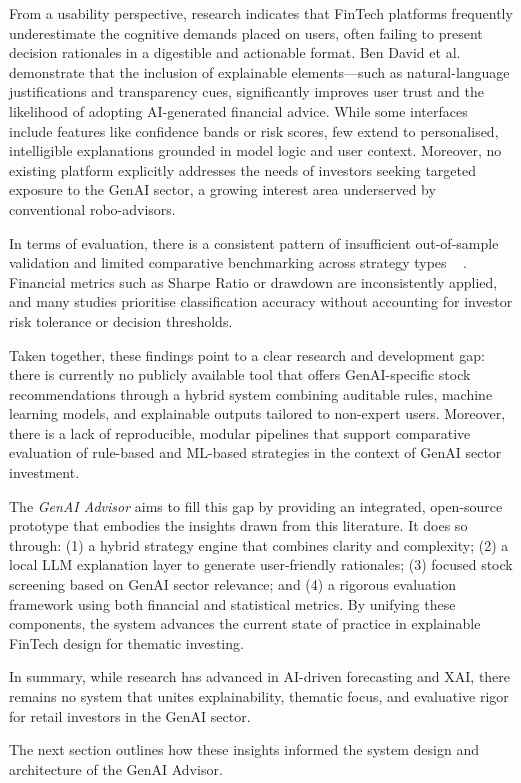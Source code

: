 From a usability perspective, research indicates that FinTech platforms frequently underestimate the cognitive demands placed on users, often failing to present decision rationales in a digestible and actionable format. Ben David et al.~\cite{bendavid2021explainable} demonstrate that the inclusion of explainable elements—such as natural-language justifications and transparency cues, significantly improves user trust and the likelihood of adopting AI-generated financial advice. While some interfaces include features like confidence bands or risk scores, few extend to personalised, intelligible explanations grounded in model logic and user context. Moreover, no existing platform explicitly addresses the needs of investors seeking targeted exposure to the GenAI sector, a growing interest area underserved by conventional robo-advisors.

In terms of evaluation, there is a consistent pattern of insufficient out-of-sample validation and limited comparative benchmarking across strategy types ~\cite{bailey2014backtest} \cite{kaastra1996forecasting}. Financial metrics such as Sharpe Ratio or drawdown are inconsistently applied, and many studies prioritise classification accuracy without accounting for investor risk tolerance or decision thresholds.

Taken together, these findings point to a clear research and development gap: there is currently no publicly available tool that offers GenAI-specific stock recommendations through a hybrid system combining auditable rules, machine learning models, and explainable outputs tailored to non-expert users. Moreover, there is a lack of reproducible, modular pipelines that support comparative evaluation of rule-based and ML-based strategies in the context of GenAI sector investment.

The \textit{GenAI Advisor} aims to fill this gap by providing an integrated, open-source prototype that embodies the insights drawn from this literature. It does so through: (1) a hybrid strategy engine that combines clarity and complexity; (2) a local LLM explanation layer to generate user-friendly rationales; (3) focused stock screening based on GenAI sector relevance; and (4) a rigorous evaluation framework using both financial and statistical metrics. By unifying these components, the system advances the current state of practice in explainable FinTech design for thematic investing.

In summary, while research has advanced in AI-driven forecasting and XAI, there remains no system that unites explainability, thematic focus, and evaluative rigor for retail investors in the GenAI sector.

The next section outlines how these insights informed the system design and architecture of the GenAI Advisor.